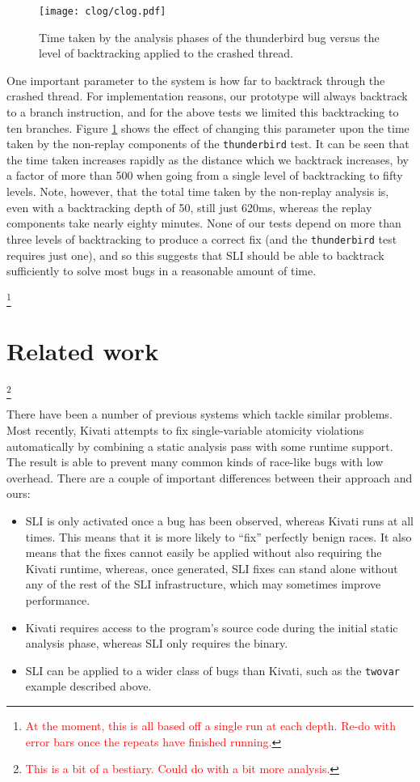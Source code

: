 \documentclass[10pt,twocolumn,preprint,natbib,authoryear]{sigplanconf}
\newcommand{\editorial}[1]{\textcolor{red}{\footnote{\textcolor{red}{#1}}}}
\begin{document}
\begin{figure}
\texttt{[image: clog/clog.pdf]}
\caption{Time taken by the analysis phases of the thunderbird bug
  versus the level of backtracking applied to the crashed thread.}
\label{fig:eval:backtrack}
\end{figure}

One important parameter to the system is how far to backtrack through
the crashed thread.  For implementation reasons, our prototype will
always backtrack to a branch instruction, and for the above tests we
limited this backtracking to ten branches.  Figure
\ref{fig:eval:backtrack} shows the effect of changing this parameter
upon the time taken by the non-replay components of the
\verb|thunderbird| test.  It can be seen that the time taken increases
rapidly as the distance which we backtrack increases, by a factor of
more than 500 when going from a single level of backtracking to fifty
levels.  Note, however, that the total time taken by the non-replay
analysis is, even with a backtracking depth of 50, still just 620ms,
whereas the replay components take nearly eighty minutes.  None of our
tests depend on more than three levels of backtracking to produce a
correct fix (and the \verb|thunderbird| test requires just one), and
so this suggests that SLI should be able to backtrack sufficiently to
solve most bugs in a reasonable amount of time.

\editorial{At the moment, this is all based off a single run at each
  depth.  Re-do with error bars once the repeats have finished running.}

\section{Related work}\editorial{This is a bit of a bestiary.  Could do with a bit more analysis.}

There have been a number of previous systems which tackle similar
problems.  Most recently, Kivati\cite{Chew2010a} attempts to fix
single-variable atomicity violations automatically by combining a
static analysis pass with some runtime support.  The result is able to
prevent many common kinds of race-like bugs with low overhead.  There
are a couple of important differences between their approach and ours:

\begin{itemize}
\item SLI is only activated once a bug has been observed, whereas
  Kivati runs at all times.  This means that it is more likely to
  ``fix'' perfectly benign races.  It also means that the fixes cannot
  easily be applied without also requiring the Kivati runtime,
  whereas, once generated, SLI fixes can stand alone without any of
  the rest of the SLI infrastructure, which may sometimes improve
  performance.

\item Kivati requires access to the program's source code during the
  initial static analysis phase, whereas SLI only requires the binary.

\item SLI can be applied to a wider class of bugs than Kivati, such as
  the \verb|twovar| example described above.
\end{itemize}
\end{document}
